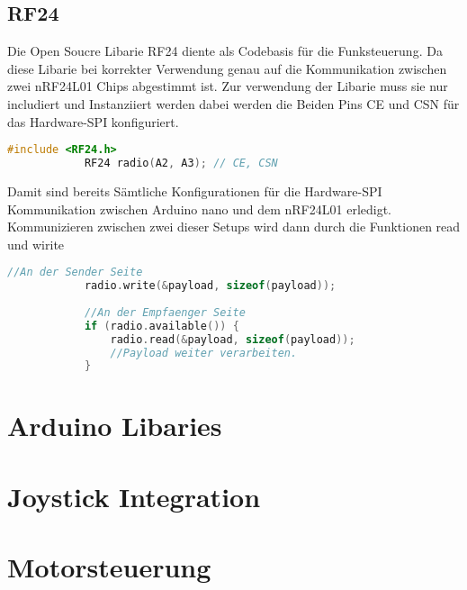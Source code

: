 \documentclass{article}
\begin{document}
    \subsection{RF24} %
       Die Open Soucre Libarie RF24 \cite{RF24_Lib} diente als Codebasis für die Funksteuerung. Da diese Libarie bei korrekter Verwendung genau auf die Kommunikation zwischen zwei nRF24L01 Chips abgestimmt ist.
       Zur verwendung der Libarie muss sie nur includiert und Instanziiert werden dabei werden die Beiden Pins CE und CSN für das Hardware-SPI konfiguriert.
       
       \begin{file}[RF24 initialisieren]
        \begin{lstlisting}[language=C]
            #include <RF24.h>
            RF24 radio(A2, A3); // CE, CSN
        \end{lstlisting}
        \end{file}
        
        Damit sind bereits Sämtliche Konfigurationen für die Hardware-SPI Kommunikation zwischen Arduino nano und dem nRF24L01 erledigt.
        Kommunizieren zwischen zwei dieser Setups wird dann durch die Funktionen read und wirite 
       \begin{file}[RF24 initialisieren]
        \begin{lstlisting}[language=C]
            //An der Sender Seite
            radio.write(&payload, sizeof(payload));
            
            //An der Empfaenger Seite
            if (radio.available()) {
                radio.read(&payload, sizeof(payload));
                //Payload weiter verarbeiten.
            }
        \end{lstlisting}
        \end{file} 
        
    
\newpage
\section{Arduino Libaries} %

\newpage
\section{Joystick Integration} %

\newpage
\section{Motorsteuerung} %
\end{document}
